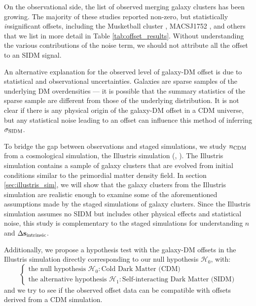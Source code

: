 On the observational side, the list of observed merging galaxy 
clusters has been growing.
The majority of these studies reported non-zero,
but statistically {\it in}significant offsets, including the Musketball cluster
\citep{Dawson2013}, MACSJ1752 \citep{Jee2015}, 
and others that we list in more detail in Table \ref{tab:offset_results}.
Without understanding the various contributions of the noise term, 
we should not attribute all the offset to an SIDM signal. 

An alternative explanation for the observed level of galaxy-DM offset is due to 
statistical and observational uncertainties. Galaxies are
sparse samples of the underlying DM overdensities --- it is possible that the 
summary statistics of the sparse sample are different from those of the 
underlying distribution. 
It is not clear if there is any physical
origin of the galaxy-DM offset in a CDM universe, 
but any statistical noise leading to an offset can influence this method of 
inferring $\sigma_{\rm SIDM}$. 

To bridge the gap between observations and staged simulations, we
study $n_{\rm CDM}$ from a cosmological simulation, the Illustris simulation
(\citealt{Vogelsberger2014}, \citealt{Genel2014a}). 
The Illustris simulation contains a sample of galaxy clusters that are evolved
from initial conditions similar to the primordial
matter density field. In section \ref{sec:illustris_sim},
we will show that the galaxy clusters from the Illustris simulation 
are realistic enough to examine some of the aforementioned assumptions made by the
staged simulations of galaxy clusters. Since the Illustris simulation assumes no SIDM but 
includes other physical effects and statistical noise, 
this study is complementary to the 
staged simulations for understanding $n$ and $\Delta {\bf s}_{\rm intrinsic}$. 

Additionally, we propose a hypothesis test with the galaxy-DM offsets in
the Illustris simulation directly corresponding to our null hypothesis
$\mathcal{H}_0$, with: 
\begin{equation}
\begin{cases}
	\text{the null hypothesis }\mathcal{H}_0: \text{Cold Dark Matter (CDM)} \\
	\text{the alternative hypothesis }\mathcal{H}_1: \text{Self-interacting Dark
	Matter (SIDM)} 
\end{cases}
\end{equation}
and we try to see if the observed offset data can be compatible with offsets
derived from a CDM simulation. 

